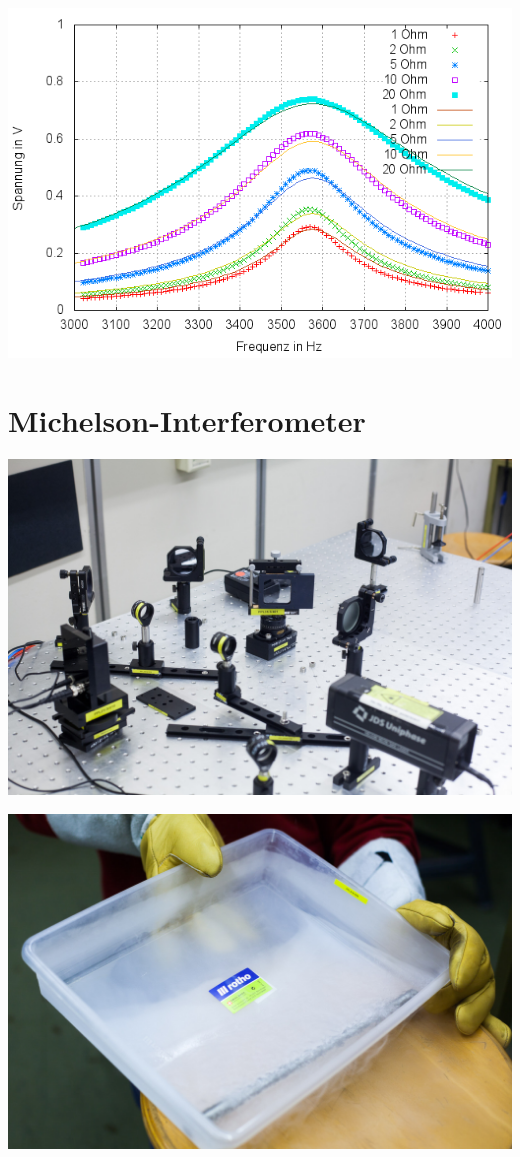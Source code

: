 \documentclass[11pt]{beamer}
\begin{document}
\begin{frame}
	\includegraphics[width=\textwidth]{images/1/plot}
\end{frame}


\section{Michelson-Interferometer}
\begin{frame}
	\includegraphics[width=\textwidth]{images/2/interferrometer-4}
\end{frame}

\begin{frame}
	\includegraphics[width=\textwidth]{images/2/interferrometer-1}
\end{frame}
\end{document}
